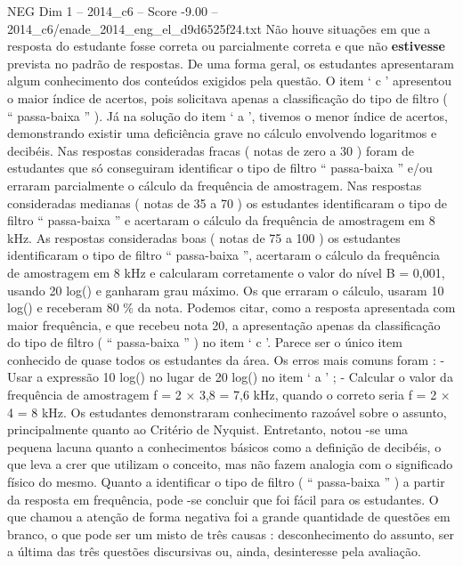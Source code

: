 \begin{textsample}{NEG Dim 1 – 2014\_c6 – Score -9.00 – 2014\_c6/enade\_2014\_eng\_el\_d9d6525f24.txt}
Não houve situações em que a resposta do estudante fosse correta ou parcialmente correta e que não \textbf{estivesse} prevista no padrão de respostas.
De uma forma geral, os estudantes apresentaram algum conhecimento dos conteúdos exigidos pela questão.
O item ‘ c ’ apresentou o maior índice de acertos, pois solicitava apenas a classificação do tipo de filtro ( “ passa-baixa ” ).
Já na solução do item ‘ a ’, tivemos o menor índice de acertos, demonstrando existir uma deficiência grave no cálculo envolvendo logaritmos e decibéis.
Nas respostas consideradas fracas ( notas de zero a 30 ) foram de estudantes que só conseguiram identificar o tipo de filtro “ passa-baixa ” e/ou erraram parcialmente o cálculo da frequência de amostragem.
Nas respostas consideradas medianas ( notas de 35 a 70 ) os estudantes identificaram o tipo de filtro “ passa-baixa ” e acertaram o cálculo da frequência de amostragem em 8 kHz.
As respostas consideradas boas ( notas de 75 a 100 ) os estudantes identificaram o tipo de filtro “ passa-baixa ”, acertaram o cálculo da frequência de amostragem em 8 kHz e calcularam corretamente o valor do nível B = 0,001, usando 20 log() e ganharam grau máximo.
Os que erraram o cálculo, usaram 10 log() e receberam 80 \% da nota.
Podemos citar, como a resposta apresentada com maior frequência, e que recebeu nota 20, a apresentação apenas da classificação do tipo de filtro ( “ passa-baixa ” ) no item ‘ c ’.
Parece ser o único item conhecido de quase todos os estudantes da área.
Os erros mais comuns foram : - Usar a expressão 10 log() no lugar de 20 log() no item ‘ a ’ ; - Calcular o valor da frequência de amostragem f = 2 × 3,8 = 7,6 kHz, quando o correto seria f = 2 × 4 = 8 kHz.
Os estudantes demonstraram conhecimento razoável sobre o assunto, principalmente quanto ao Critério de Nyquist.
Entretanto, notou -se uma pequena lacuna quanto a conhecimentos básicos como a definição de decibéis, o que leva a crer que utilizam o conceito, mas não fazem analogia com o significado físico do mesmo.
Quanto a identificar o tipo de filtro ( “ passa-baixa ” ) a partir da resposta em frequência, pode -se concluir que foi fácil para os estudantes.
O que chamou a atenção de forma negativa foi a grande quantidade de questões em branco, o que pode ser um misto de três causas : desconhecimento do assunto, ser a última das três questões discursivas ou, ainda, desinteresse pela avaliação.

\end{textsample}
